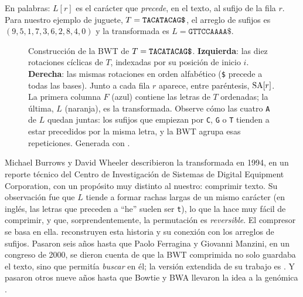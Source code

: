 \begin{simbolos}
\end{simbolos}

En palabras: $L[r]$ es el carácter que \emph{precede}, en el texto, al sufijo de la fila $r$. Para nuestro ejemplo de juguete, $T=\texttt{TACATACAG\$}$, el arreglo de sufijos es $(9,5,1,7,3,6,2,8,4,0)$ y la transformada es $L=\texttt{GTTCCAAAA\$}$.

\begin{figure}[tbp]
\centering

\caption[Rotaciones y transformada de Burrows-Wheeler]{Construcción de la BWT de $T=\texttt{TACATACAG\$}$. \textbf{Izquierda}: las diez rotaciones cíclicas de $T$, indexadas por su posición de inicio $i$. \textbf{Derecha}: las mismas rotaciones en orden alfabético (\texttt{\$} precede a todas las bases). Junto a cada fila $r$ aparece, entre paréntesis, $\operatorname{SA}[r]$. La primera columna $F$ (azul) contiene las letras de $T$ ordenadas; la última, $L$ (naranja), es la transformada. Observe cómo las cuatro \texttt{A} de $L$ quedan juntas: los sufijos que empiezan por \texttt{C}, \texttt{G} o \texttt{T} tienden a estar precedidos por la misma letra, y la BWT agrupa esas repeticiones. Generada con .}
\label{fig:07-rotaciones}
\end{figure}

\begin{historia}
Michael Burrows y David Wheeler describieron la transformada en 1994, en un reporte técnico del Centro de Investigación de Sistemas de Digital Equipment Corporation, con un propósito muy distinto al nuestro: comprimir texto. Su observación fue que $L$ tiende a formar rachas largas de un mismo carácter (en inglés, las letras que preceden a ``he'' suelen ser \texttt{t}), lo que la hace muy fácil de comprimir, y que, sorprendentemente, la permutación es \emph{reversible}. El compresor  se basa en ella. \textcite{c07-adjeroh2008} reconstruyen esta historia y su conexión con los arreglos de sufijos. Pasaron seis años hasta que Paolo Ferragina y Giovanni Manzini, en un congreso de 2000, se dieron cuenta de que la BWT comprimida no solo guardaba el texto, sino que permitía \emph{buscar} en él; la versión extendida de su trabajo es \textcite{c07-ferragina2005}. Y pasaron otros nueve años hasta que Bowtie y BWA llevaron la idea a la genómica \parencite{c07-langmead2009,c07-li2009bwa}.
\end{historia}

